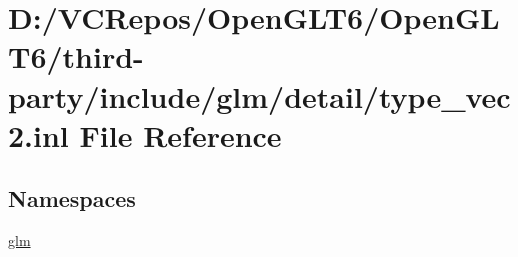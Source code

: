 \hypertarget{type__vec2_8inl}{}\section{D\+:/\+V\+C\+Repos/\+Open\+G\+L\+T6/\+Open\+G\+L\+T6/third-\/party/include/glm/detail/type\+\_\+vec2.inl File Reference}
\label{type__vec2_8inl}
\subsection*{Namespaces}
\begin{DoxyCompactItemize}
\item 
 \mbox{\hyperlink{namespaceglm}{glm}}
\end{DoxyCompactItemize}
